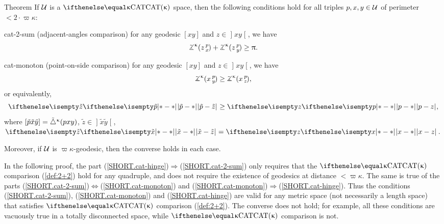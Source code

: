 \begin{thm}{Theorem}
\label{thm:defs_of_cat} 
If $\mathcal{U}$ is a $\CAT\kappa$ space, then 
the following conditions hold for all triples $p,x,y\in \spc{U}$ of perimeter $<2\cdot\varpi\kappa$:

\begin{subthm}{cat-2-sum} (adjacent-angles comparison) for any geodesic $[x y]$ and $z\in \mathopen{]}x y\mathclose{[}$, we have
\[\angk\kappa z p x
+\angk\kappa z p y\ge \pi.\]
\end{subthm}

\begin{subthm}{cat-monoton}
(point-on-side comparison) 
for any geodesic $[x y]$ and $z\in \mathopen{]}x y\mathclose{[}$, we have
\[\angk\kappa x p y\ge\angk\kappa x p z,\]
or equivalently, 
\[\dist{\tilde p}{\tilde z}{}\ge \dist{p}{z}{},\]
where $[{\tilde p}{\tilde x}{\tilde y}]={\tilde\triangle}^{\upkappa}(p x y)$, $\tilde z\in\mathopen{]} \tilde x\tilde y\mathclose{[}$, $\dist{\tilde x}{\tilde z}{}=\dist{x}{z}{}$.
\end{subthm}


Moreover, if  $\mathcal{U}$ is  $\varpi\kappa$-geodesic, then the converse holds in each case.  

\end{thm}


\label{22remark}
In the following proof, the part (\ref{SHORT.cat-hinge})$\Rightarrow$(\ref{SHORT.cat-2-sum})
only requires that the $\CAT\kappa$ comparison (\ref{def:2+2}) hold for any quadruple, and does not require the existence of geodesics at distance $<\varpi\kappa$. 
The same is true of the parts (\ref{SHORT.cat-2-sum})$\Leftrightarrow$(\ref{SHORT.cat-monoton}) and
(\ref{SHORT.cat-monoton})$\Rightarrow$(\ref{SHORT.cat-hinge}).  
Thus the conditions (\ref{SHORT.cat-2-sum}), (\ref{SHORT.cat-monoton}) and (\ref{SHORT.cat-hinge}) are valid for any metric space (not necessarily a length space) that satisfies $\CAT\kappa$ comparison (\ref{def:2+2}). 
The converse does not hold; for example, all these conditions are 
vacuously true in a 
totally disconnected space, while 
$\CAT\kappa$ comparison is not.

